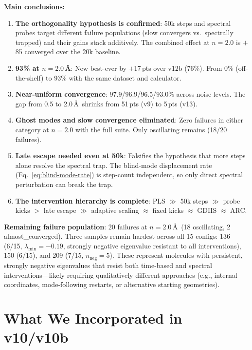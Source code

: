 \documentclass[11pt,a4paper]{article}
\theoremstyle{definition}
\begin{document}
\textbf{Main conclusions:}
\begin{enumerate}[nosep]
  \item \textbf{The orthogonality hypothesis is confirmed}: 50k steps and
    spectral probes target different failure populations (slow convergers
    vs.\ spectrally trapped) and their gains stack additively.  The combined
    effect at $n=2.0$ is $+$85 converged over the 20k baseline.
  \item \textbf{93\% at $n=2.0$\,\AA}: New best-ever by $+$17\,pts over
    v12b (76\%).  From 0\% (off-the-shelf) to 93\% with the same dataset
    and calculator.
  \item \textbf{Near-uniform convergence}: 97.9/96.9/96.5/93.0\% across
    noise levels.  The gap from 0.5 to 2.0\,\AA\ shrinks from 51\,pts
    (v9) to 5\,pts (v13).
  \item \textbf{Ghost modes and slow convergence eliminated}: Zero
    failures in either category at $n=2.0$ with the full suite.  Only
    oscillating remains (18/20 failures).
  \item \textbf{Late escape needed even at 50k}: Falsifies the hypothesis
    that more steps alone resolve the spectral trap.  The blind-mode
    displacement rate (Eq.~\ref{eq:blind-mode-rate}) is step-count
    independent, so only direct spectral perturbation can break the trap.
  \item \textbf{The intervention hierarchy is complete}: PLS $\gg$
    50k steps $\gg$ probe kicks $>$ late escape $\gg$ adaptive scaling
    $\approx$ fixed kicks $\approx$ GDIIS $\approx$ ARC.
\end{enumerate}

\textbf{Remaining failure population}: 20 failures at $n=2.0$\,\AA\
(18 oscillating, 2 almost\_converged).  Three samples remain hardest across
all 15 configs: 136 (6/15, $\lambda_\text{min}=-0.19$, strongly negative
eigenvalue resistant to all interventions), 150 (6/15), and 209 (7/15,
$n_\text{neg}=5$).  These represent molecules with persistent,
strongly negative eigenvalues that resist both time-based and spectral
interventions---likely requiring qualitatively different approaches
(e.g., internal coordinates, mode-following restarts, or alternative
starting geometries).

\section{What We Incorporated in v10/v10b}
\label{sec:incorporated}
\end{document}
